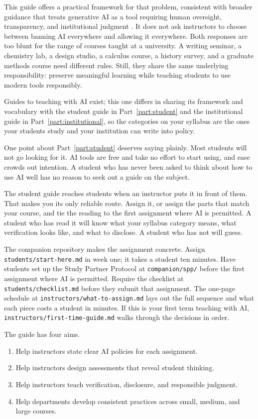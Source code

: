 \documentclass{SIAMbook2023}
\begin{document}
This guide offers a practical framework for that problem, consistent with broader guidance that treats generative AI as a tool requiring human oversight, transparency, and institutional judgment \citep{miao2023guidance}. It does not ask instructors to choose between banning AI everywhere and allowing it everywhere. Both responses are too blunt for the range of courses taught at a university. A writing seminar, a chemistry lab, a design studio, a calculus course, a history survey, and a graduate methods course need different rules. Still, they share the same underlying responsibility: preserve meaningful learning while teaching students to use modern tools responsibly.

Guides to teaching with AI exist; this one differs in sharing its framework and vocabulary with the student guide in Part~\ref{part:student} and the institutional guide in Part~\ref{part:institutional}, so the categories on your syllabus are the ones your students study and your institution can write into policy.

One point about Part~\ref{part:student} deserves saying plainly. Most students will not go looking for it. AI tools are free and take no effort to start using, and ease crowds out intention. A student who has never been asked to think about how to use AI well has no reason to seek out a guide on the subject.

The student guide reaches students when an instructor puts it in front of them. That makes you its only reliable route. Assign it, or assign the parts that match your course, and tie the reading to the first assignment where AI is permitted. A student who has read it will know what your syllabus category means, what verification looks like, and what to disclose. A student who has not will guess.

The companion repository makes the assignment concrete. Assign \texttt{students/start-here.md} in week one; it takes a student ten minutes. Have students set up the Study Partner Protocol at \texttt{companion/spp/} before the first assignment where AI is permitted. Require the checklist at \texttt{students/checklist.md} before they submit that assignment. The one-page schedule at \texttt{instructors/what-to-assign.md} lays out the full sequence and what each piece costs a student in minutes. If this is your first term teaching with AI, \texttt{instructors/first-time-guide.md} walks through the decisions in order.

The guide has four aims.

\begin{enumerate}
\item Help instructors state clear AI policies for each assignment.
\item Help instructors design assessments that reveal student thinking.
\item Help instructors teach verification, disclosure, and responsible judgment.
\item Help departments develop consistent practices across small, medium, and large courses.
\end{enumerate}
\end{document}
